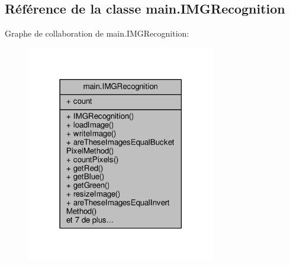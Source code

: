 \hypertarget{classmain_1_1IMGRecognition}{}\subsection{Référence de la classe main.\+I\+M\+G\+Recognition}
\label{classmain_1_1IMGRecognition}


Graphe de collaboration de main.\+I\+M\+G\+Recognition\+:\nopagebreak
\begin{figure}[H]
\begin{center}
\leavevmode
\includegraphics[width=234pt]{classmain_1_1IMGRecognition__coll__graph}
\end{center}
\end{figure}
